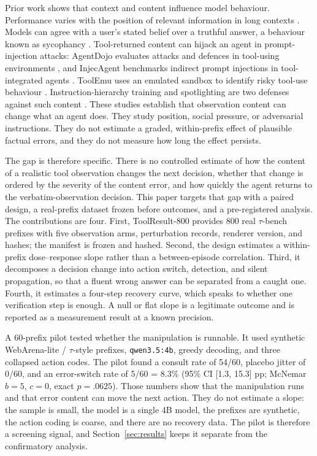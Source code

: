\documentclass[a4paper,fleqn]{cas-sc}
\begin{document}
Prior work shows that context and content influence model behaviour. Performance varies with the
position of relevant information in long contexts \cite{lostmiddle}. Models can agree with a
user's stated belief over a truthful answer, a behaviour known as sycophancy \cite{sycophancy}.
Tool-returned content can hijack an agent in prompt-injection attacks: AgentDojo evaluates
attacks and defences in tool-using environments \cite{agentdojo}, and InjecAgent benchmarks
indirect prompt injections in tool-integrated agents \cite{injecagent}. ToolEmu uses an emulated
sandbox to identify risky tool-use behaviour \cite{toolemu}. Instruction-hierarchy training and
spotlighting are two defenses against such content \cite{instruction_hierarchy,spotlighting}.
These studies establish that
observation content can change what an agent does. They study position, social pressure, or
adversarial instructions. They do not estimate a graded, within-prefix effect of plausible
factual errors, and they do not measure how long the effect persists.

The gap is therefore specific. There is no controlled estimate of how the content of a realistic
tool observation changes the next decision, whether that change is ordered by the severity of the
content error, and how quickly the agent returns to the verbatim-observation decision. This
paper targets that gap with a paired design, a real-prefix dataset frozen before outcomes, and a
pre-registered analysis. The contributions are four. First, ToolResult-800 provides 800 real $\tau$-bench
prefixes with five observation arms, perturbation records, renderer version, and hashes; the
manifest is frozen and hashed. Second, the design estimates a within-prefix dose--response slope
rather than a between-episode
correlation. Third, it decomposes a decision change into action switch, detection, and silent
propagation, so that a fluent wrong answer can be separated from a caught one. Fourth, it
estimates a four-step recovery curve, which speaks to whether one verification step is enough. A
null or flat slope is a legitimate outcome and is reported as a measurement result at a known
precision.

A 60-prefix pilot tested whether the manipulation is runnable. It used synthetic WebArena-lite /
$\tau$-style prefixes, \texttt{qwen3.5:4b}, greedy decoding, and three collapsed action codes. The
pilot found a consult rate of 54/60, placebo jitter of 0/60, and an error-switch rate of
5/60 = 8.3\% (95\% CI [1.3, 15.3] pp; McNemar $b=5$, $c=0$, exact $p=.0625$). Those numbers show
that the manipulation runs and that error content can move the next action. They do not estimate
a slope: the sample is small, the model is a single 4B model, the prefixes are synthetic, the
action coding is coarse, and there are no recovery data. The pilot is therefore a screening
signal, and Section~\ref{sec:results} keeps it separate from the confirmatory analysis.
\end{document}
